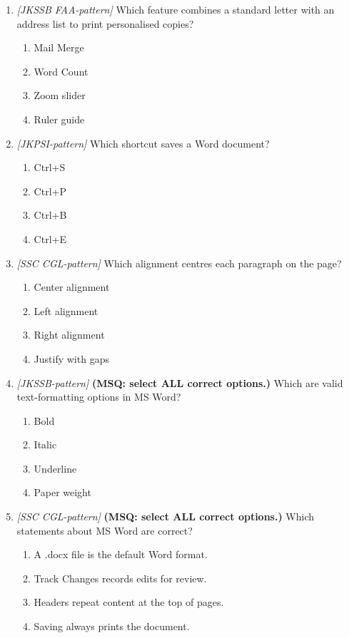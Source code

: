 \documentclass[11pt]{article}
\begin{document}
\begin{enumerate}[label=\textbf{Q\arabic*.}, leftmargin=*]
\item \textit{[JKSSB FAA-pattern]} Which feature combines a standard letter with an address list to print personalised copies?
  \begin{enumerate}[label=\Alph*.]
    \item Mail Merge
    \item Word Count
    \item Zoom slider
    \item Ruler guide
  \end{enumerate}
\item \textit{[JKPSI-pattern]} Which shortcut saves a Word document?
  \begin{enumerate}[label=\Alph*.]
    \item Ctrl+S
    \item Ctrl+P
    \item Ctrl+B
    \item Ctrl+E
  \end{enumerate}
\item \textit{[SSC CGL-pattern]} Which alignment centres each paragraph on the page?
  \begin{enumerate}[label=\Alph*.]
    \item Center alignment
    \item Left alignment
    \item Right alignment
    \item Justify with gaps
  \end{enumerate}
\item \textit{[JKSSB-pattern]} \textbf{(MSQ: select ALL correct options.)} Which are valid text-formatting options in MS Word?
  \begin{enumerate}[label=\Alph*.]
    \item Bold
    \item Italic
    \item Underline
    \item Paper weight
  \end{enumerate}
\item \textit{[SSC CGL-pattern]} \textbf{(MSQ: select ALL correct options.)} Which statements about MS Word are correct?
  \begin{enumerate}[label=\Alph*.]
    \item A .docx file is the default Word format.
    \item Track Changes records edits for review.
    \item Headers repeat content at the top of pages.
    \item Saving always prints the document.
  \end{enumerate}
\end{enumerate}
\def\JKSSBLessonID{22}
\def\JKSSBAnswers{0}

\end{document}

